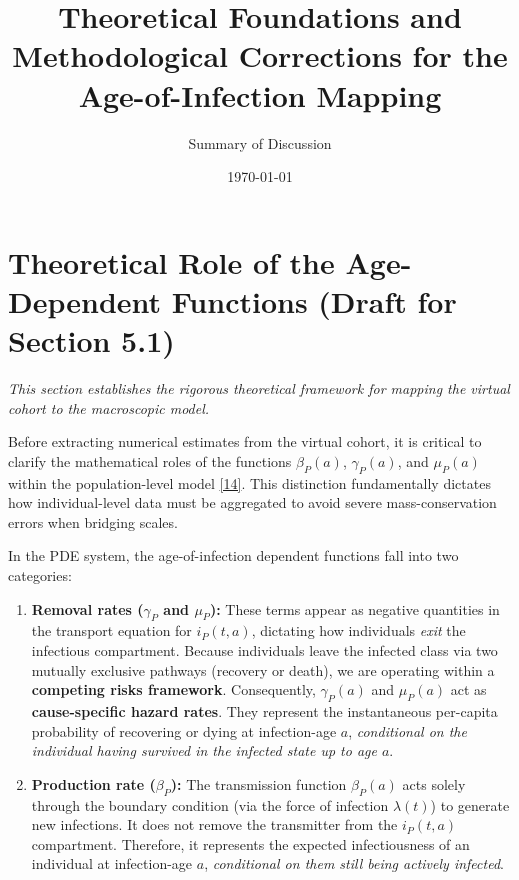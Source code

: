 \documentclass[11pt]{article}
\title{Theoretical Foundations and Methodological Corrections for the Age-of-Infection Mapping}
\author{Summary of Discussion}
\date{\today}
\begin{document}
\maketitle

\section{Theoretical Role of the Age-Dependent Functions (Draft for Section 5.1)}

\textit{This section establishes the rigorous theoretical framework for mapping the virtual cohort to the macroscopic model.}

Before extracting numerical estimates from the virtual cohort, it is critical to clarify the mathematical roles of the functions $\beta_P(a)$, $\gamma_P(a)$, and $\mu_P(a)$ within the population-level model \eqref{14}. This distinction fundamentally dictates how individual-level data must be aggregated to avoid severe mass-conservation errors when bridging scales.

In the PDE system, the age-of-infection dependent functions fall into two categories:
\begin{enumerate}
    \item \textbf{Removal rates ($\gamma_P$ and $\mu_P$):} These terms appear as negative quantities in the transport equation for $i_P(t,a)$, dictating how individuals \emph{exit} the infectious compartment. Because individuals leave the infected class via two mutually exclusive pathways (recovery or death), we are operating within a \textbf{competing risks framework}. Consequently, $\gamma_P(a)$ and $\mu_P(a)$ act as \textbf{cause-specific hazard rates}. They represent the instantaneous per-capita probability of recovering or dying at infection-age $a$, \emph{conditional on the individual having survived in the infected state up to age $a$}.
    
    \item \textbf{Production rate ($\beta_P$):} The transmission function $\beta_P(a)$ acts solely through the boundary condition (via the force of infection $\lambda(t)$) to generate new infections. It does not remove the transmitter from the $i_P(t,a)$ compartment. Therefore, it represents the expected infectiousness of an individual at infection-age $a$, \emph{conditional on them still being actively infected}.
\end{enumerate}
\end{document}
